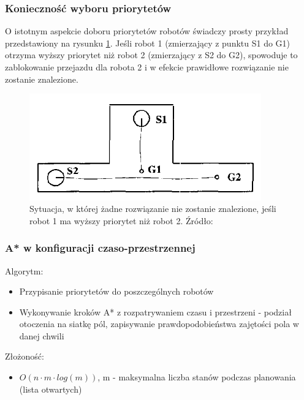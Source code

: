 \subsubsection{Konieczność wyboru priorytetów}
O istotnym aspekcie doboru priorytetów robotów świadczy prosty przykład przedstawiony na rysunku \ref{fig:image_article1_fig1}. Jeśli robot 1 (zmierzający z punktu S1 do G1) otrzyma wyższy priorytet niż robot 2 (zmierzający z S2 do G2), spowoduje to zablokowanie przejazdu dla robota 2 i w efekcie prawidłowe rozwiązanie nie zostanie znalezione.
\begin{figure}[H]
	\centering
	\includegraphics[width=10cm]{img/article1/fig1}
	\caption{Sytuacja, w której żadne rozwiązanie nie zostanie znalezione, jeśli robot 1 ma wyższy priorytet niż robot 2. Źródło: \cite{optpriorities}}
	\label{fig:image_article1_fig1}
\end{figure}

\subsubsection{A* w konfiguracji czaso-przestrzennej}
Algorytm:
\begin{itemize}
	\item Przypisanie priorytetów do poszczególnych robotów
	\item Wykonywanie kroków A* z rozpatrywaniem czasu i przestrzeni - podział otoczenia na siatkę pól, zapisywanie prawdopodobieństwa zajętości pola w danej chwili
\end{itemize}
Złożoność:
\begin{itemize}
	\item $O(n \cdot m \cdot log(m))$, m - maksymalna liczba stanów podczas planowania (lista otwartych) %
\end{itemize}

